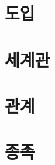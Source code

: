 \documentclass{report}
\begin{document}
	\parttoc
	
	\chapter{도입}
		
	
	\chapter{세계관}
		
	
	\chapter{관계}
		
	
	\chapter{종족}
		
\end{document}
